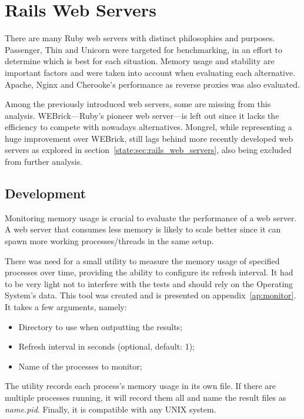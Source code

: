 \section{Rails Web Servers} %
\label{solution:sec:rails_web_servers}

There are many Ruby web servers with distinct philosophies and purposes. Passenger, Thin and Unicorn were targeted for benchmarking, in an effort to determine which is best for each situation. Memory usage and stability are important factors and were taken into account when evaluating each alternative. Apache, Nginx and Cherooke's performance as reverse proxies was also evaluated.

Among the previously introduced web servers, some are missing from this analysis. WEBrick---Ruby's pioneer web server---is left out since it lacks the efficiency to compete with nowadays alternatives. Mongrel, while representing a huge improvement over WEBrick, still lags behind more recently developed web servers as explored in section~\ref{state:sec:rails_web_servers}, also being excluded from further analysis.


\subsection{Development}
Monitoring memory usage is crucial to evaluate the performance of a web server. A web server that consumes less memory is likely to scale better since it can spawn more working processes/threads in the same setup.

There was need for a small utility to measure the memory usage of specified processes over time, providing the ability to configure its refresh interval. It had to be very light not to interfere with the tests and should rely on the Operating System's data. This tool was created and is presented on appendix~\ref{ap:monitor}. It takes a few arguments, namely:
\begin{itemize}
  \item Directory to use when outputting the results;
  \item Refresh interval in seconds (optional, default: 1);
  \item Name of the processes to monitor;
\end{itemize}
The utility records each process's memory usage in its own file. If there are multiple processes running, it will record them all and name the result files as \textit{name.pid}. Finally, it is compatible with any UNIX system.

